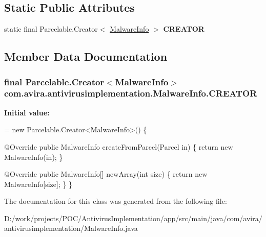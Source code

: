 \subsection*{Static Public Attributes}
\begin{DoxyCompactItemize}
\item 
static final Parcelable.\+Creator$<$ \hyperlink{classcom_1_1avira_1_1antivirusimplementation_1_1_malware_info}{Malware\+Info} $>$ {\bfseries C\+R\+E\+A\+T\+O\+R}
\end{DoxyCompactItemize}


\subsection{Member Data Documentation}
\hypertarget{classcom_1_1avira_1_1antivirusimplementation_1_1_malware_info_a7f0937c09bf8a067338d99863ff35810}{}
\subsubsection[{C\+R\+E\+A\+T\+O\+R}]{\setlength{\rightskip}{0pt plus 5cm}final Parcelable.\+Creator$<${\bf Malware\+Info}$>$ com.\+avira.\+antivirusimplementation.\+Malware\+Info.\+C\+R\+E\+A\+T\+O\+R\hspace{0.3cm}{\ttfamily [static]}}\label{classcom_1_1avira_1_1antivirusimplementation_1_1_malware_info_a7f0937c09bf8a067338d99863ff35810}
{\bfseries Initial value\+:}
\begin{DoxyCode}
= \textcolor{keyword}{new} Parcelable.Creator<MalwareInfo>() \{
        
        @Override
        \textcolor{keyword}{public} MalwareInfo createFromParcel(Parcel in) \{
            \textcolor{keywordflow}{return} \textcolor{keyword}{new} MalwareInfo(in);
        \}

        
        @Override
        \textcolor{keyword}{public} MalwareInfo[] newArray(\textcolor{keywordtype}{int} size) \{
            \textcolor{keywordflow}{return} \textcolor{keyword}{new} MalwareInfo[size];
        \}
    \}
\end{DoxyCode}


The documentation for this class was generated from the following file\+:\begin{DoxyCompactItemize}
\item 
D\+:/work/projects/\+P\+O\+C/\+Antivirus\+Implementation/app/src/main/java/com/avira/antivirusimplementation/Malware\+Info.\+java\end{DoxyCompactItemize}
